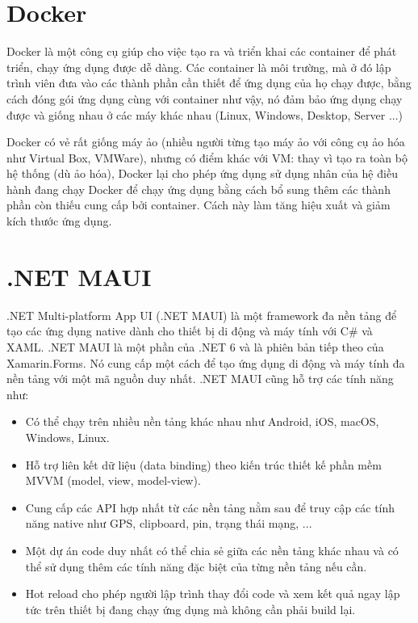 \documentclass[../DoAn.tex]{subfiles}
\begin{document}
\section{Docker}
\label{section:3.3}
Docker là một công cụ giúp cho việc tạo ra và triển khai các container để phát triển, chạy ứng dụng được dễ dàng. Các container là môi trường, mà ở đó lập trình viên đưa vào các thành phần cần thiết để ứng dụng của họ chạy được, bằng cách đóng gói ứng dụng cùng với container như vậy, nó đảm bảo ứng dụng chạy được và giống nhau ở các máy khác nhau (Linux, Windows, Desktop, Server ...)

Docker có vẻ rất giống máy ảo (nhiều người từng tạo máy ảo với công cụ ảo hóa như Virtual Box, VMWare), nhưng có điểm khác với VM: thay vì tạo ra toàn bộ hệ thống (dù ảo hóa), Docker lại cho phép ứng dụng sử dụng nhân của hệ điều hành đang chạy Docker để chạy ứng dụng bằng cách bổ sung thêm các thành phần còn thiếu cung cấp bởi container. Cách này làm tăng hiệu xuất và giảm kích thước ứng dụng.
\vfill
\break


\section{.NET MAUI}
\label{section:3.4}
.NET Multi-platform App UI (.NET MAUI) là một framework đa nền tảng để tạo các ứng dụng native dành cho thiết bị di động và máy tính với C\# và XAML. .NET MAUI là một phần của .NET 6 và là phiên bản tiếp theo của Xamarin.Forms. Nó cung cấp một cách để tạo ứng dụng di động và máy tính đa nền tảng với một mã nguồn duy nhất. .NET MAUI cũng hỗ trợ các tính năng như:
\begin{itemize}
    \item Có thể chạy trên nhiều nền tảng khác nhau như Android, iOS, macOS, Windows, Linux.
    \item Hỗ trợ liên kết dữ liệu (data binding) theo kiến trúc thiết kế phần mềm MVVM (model, view, model-view).
    \item Cung cấp các API hợp nhất từ các nền tảng nằm sau để truy cập các tính năng native như GPS, clipboard, pin, trạng thái mạng, ...
    \item Một dự án code duy nhất có thể chia sẻ giữa các nền tảng khác nhau và có thể sử dụng thêm các tính năng đặc biệt của từng nền tảng nếu cần.
    \item Hot reload cho phép người lập trình thay đổi code và xem kết quả ngay lập tức trên thiết bị đang chạy ứng dụng mà không cần phải build lại.
\end{itemize}
\end{document}
